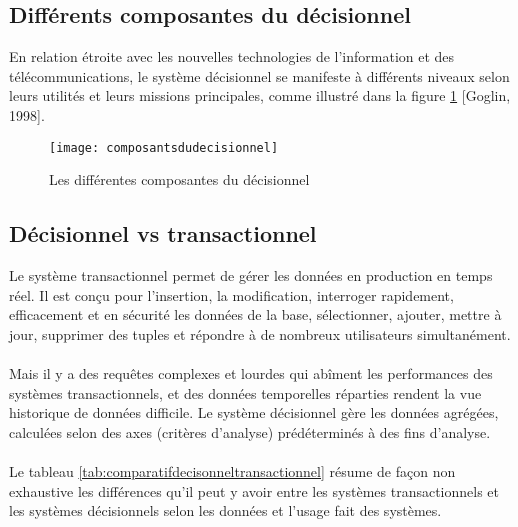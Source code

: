 \subsection{Différents composantes du décisionnel}
En relation étroite avec les nouvelles technologies de l’information et des télécommunications, le système décisionnel se manifeste à différents niveaux selon leurs utilités et leurs missions principales, comme illustré dans la figure \ref{fig:composantsdudecisionnel} [Goglin, 1998].

\begin{figure}[H]
    \centering
    \texttt{[image: composantsdudecisionnel]}
    \caption{Les différentes composantes du décisionnel}
    \label{fig:composantsdudecisionnel}
\end{figure}

\subsection{Décisionnel vs transactionnel}
Le système transactionnel permet de gérer les données en production en temps réel. Il est conçu pour l’insertion, la modification, interroger rapidement, efficacement et en sécurité les données de la base, sélectionner, ajouter, mettre à jour, supprimer des tuples et répondre à de nombreux utilisateurs simultanément.
\paragraph{}
Mais il y a des requêtes complexes et lourdes qui abîment les performances des systèmes transactionnels, et des données temporelles réparties rendent la vue historique de données difficile. Le système décisionnel gère les données agrégées, calculées selon des axes (critères d’analyse) prédéterminés à des fins d’analyse.
\paragraph{}
Le tableau \ref{tab:comparatifdecisonneltransactionnel} résume de façon non exhaustive les différences qu’il peut y avoir entre les systèmes transactionnels et les systèmes décisionnels selon les données et l’usage fait des systèmes.

